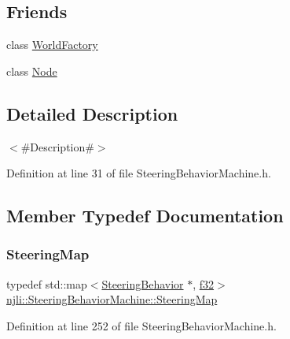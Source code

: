 \subsection*{Friends}
\begin{DoxyCompactItemize}
\item 
class \mbox{\hyperlink{classnjli_1_1_steering_behavior_machine_acb96ebb09abe8f2a37a915a842babfac}{World\+Factory}}
\item 
class \mbox{\hyperlink{classnjli_1_1_steering_behavior_machine_a6db9d28bd448a131448276ee03de1e6d}{Node}}
\end{DoxyCompactItemize}


\subsection{Detailed Description}
$<$\#\+Description\#$>$ 

Definition at line 31 of file Steering\+Behavior\+Machine.\+h.



\subsection{Member Typedef Documentation}
\mbox{\label{classnjli_1_1_steering_behavior_machine_a4140175f3174e6e8d22e977a72220b5d}} 
\subsubsection{\texorpdfstring{Steering\+Map}{SteeringMap}}
{\footnotesize\ttfamily typedef std\+::map$<$\mbox{\hyperlink{classnjli_1_1_steering_behavior}{Steering\+Behavior}} $\ast$, \mbox{\hyperlink{_util_8h_a5f6906312a689f27d70e9d086649d3fd}{f32}}$>$ \mbox{\hyperlink{classnjli_1_1_steering_behavior_machine_a4140175f3174e6e8d22e977a72220b5d}{njli\+::\+Steering\+Behavior\+Machine\+::\+Steering\+Map}}\hspace{0.3cm}{\ttfamily [protected]}}



Definition at line 252 of file Steering\+Behavior\+Machine.\+h.

\mbox{\label{classnjli_1_1_steering_behavior_machine_a1a02a6c877a13e3d51d91e0636cfff97}} 
